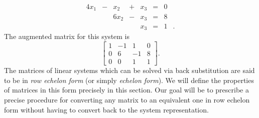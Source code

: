 \begin{alignat*}{4}
{}x_1 	&{}-{} 	&{}x_2 	&{}+{} 	&{}x_3 &{}={}	&0&{}   \\
{}			&{} 		&{6}x_2 &{}-{}	&{}x_3 &{}={} 	&8&{} \\
{}			&{}		&{}		&{}	 	&{}x_3 &{}={} 	&1&{.} 
\end{alignat*}
The augmented matrix for this system is
\[ \left[ \begin{array}{crr|c} 1 &-1 &1 &0 \\ 0& 6 &-1 &8 \\ 0&0 &1 &1 \end{array} \right]. \]
The matrices of linear systems which can be solved via back substitution are said to be in \emph{row echelon form} (or simply \emph{echelon form}). We will define the properties of matrices in this form precisely in this section. Our goal will be to prescribe a precise procedure for converting any matrix to an equivalent one in row echelon form without having to convert back to the system representation.

